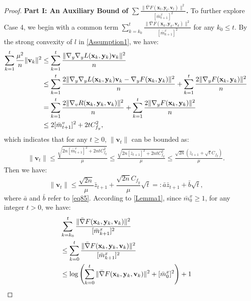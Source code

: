 \documentclass{article}
\theoremstyle{plain}
\theoremstyle{definition}
\theoremstyle{remark}
\begin{document}
\begin{proof}
\textbf{Part I: An Auxiliary Bound of $\sum \frac{\|\bar{\nabla} F(\mathbf{x}_t,\mathbf{y}_t,\mathbf{v}_t)\|^2}{[\bar{m}^x_{t+1}]^2}$.}  
To further explore Case 4, we begin with a common term $\sum_{k=k_0}^t \frac{\|\bar{\nabla} F(\mathbf{x}_k,\mathbf{y}_k,\mathbf{v}_k)\|^2}{[\bar{m}^x_{k+1}]^2}$ for any $k_0 \leq t$. By the strong convexity of $l$ in \cref{Assumption1}, we have:
\begin{align}
\sum_{k=1}^t \frac{\mu^2}{n} \|\mathbf{v}_k\|^2 
&\leq \sum_{k=1}^t \frac{\|\nabla_y \nabla_y L(\mathbf{x}_k, \mathbf{y}_k) \mathbf{v}_k\|^2}{n} \notag \\
&\leq \sum_{k=1}^t \frac{2 \|\nabla_y \nabla_y L(\mathbf{x}_k, \mathbf{y}_k) \mathbf{v}_k - \nabla_y F(\mathbf{x}_k, \mathbf{y}_k)\|^2}{n} 
+ \sum_{k=1}^t \frac{2 \|\nabla_y F(\mathbf{x}_k, \mathbf{y}_k)\|^2}{n} \notag \\
&= \sum_{k=1}^t \frac{2 \|\nabla_v R(\mathbf{x}_k, \mathbf{y}_k, \mathbf{v}_k)\|^2}{n} + \sum_{k=1}^t \frac{2 \|\nabla_y F(\mathbf{x}_k, \mathbf{y}_k)\|^2}{n} \notag \\
&\leq 2 [\bar{m}^v_{t+1}]^2 + 2t C_{f_y}^2,\label{eq92}
\end{align}
which indicates that for any $t \geq 0$, $\|\mathbf{v}_t\|$ can be bounded as:
\begin{align}
\|\mathbf{v}_t\| \leq \frac{\sqrt{2n [\bar{m}^v_{t+1}]^2 + 2nt C_{f_y}^2}}{\mu}\leq \frac{\sqrt{2n [\bar{z}_{t+1}]^2 + 2nt C_{f_y}^2}}{\mu} \leq \frac{\sqrt{2n}\left( \bar{z}_{t+1} + \sqrt{t} C_{f_y} \right)}{\mu}.\label{eq93}
\end{align}
Then we have:
\begin{equation}
    \|\mathbf{v}_t\| \leq \frac{\sqrt{2n}}{\mu} \bar{z}_{t+1} + \frac{\sqrt{2n}C_{f_y}}{\mu} \sqrt{t} =: \bar{a} \bar{z}_{t+1} + \bar{b} \sqrt{t},\label{eq94}
\end{equation}
where $\bar{a}$ and $\bar{b}$ refer to \cref{eq85}. According to \cref{Lemma1}, since $\bar{m}^x_0 \geq 1$, for any integer $t > 0$, we have:
\begin{align}
&\sum_{k=k_0}^t \frac{\| \bar{\nabla} F(\mathbf{x}_{k},\mathbf{y}_{k},\mathbf{v}_{k})\|^2}{[\bar{m}^x_{k+1}]^2}\notag\\
&\leq \sum_{k=0}^t \frac{\| \bar{\nabla} F(\mathbf{x}_{k},\mathbf{y}_{k},\mathbf{v}_{k})\|^2}{[\bar{m}^x_{k+1}]^2} \notag \\
&\leq \log \left( \sum_{k=0}^t \|\bar{\nabla} F(\mathbf{x}_{k},\mathbf{y}_{k},\mathbf{v}_{k})\|^2 + [\bar{m}^x_0]^2 \right) + 1 \notag \\

\end{align}
\end{proof}
\end{document}
